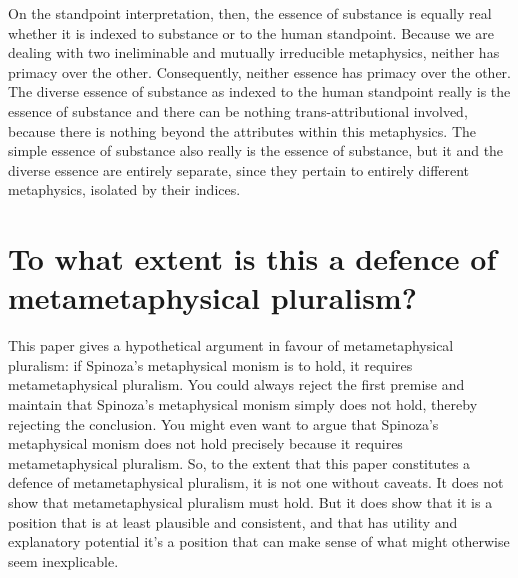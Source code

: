 \documentclass[11pt]{article}
\newcommand{\dash}{\unskip{---}}
\begin{document}
	On the standpoint interpretation, then, the essence of substance is equally real whether it is indexed to substance or to the human standpoint. Because we are dealing with two ineliminable and mutually irreducible metaphysics, neither has primacy over the other. Consequently, neither essence has primacy over the other. The diverse essence of substance as indexed to the human standpoint really is the essence of substance \dash and there can be nothing trans-attributional involved, because there is nothing beyond the attributes within this metaphysics. The simple essence of substance also really is the essence of substance, but it and the diverse essence are entirely separate, since they pertain to entirely different metaphysics, isolated by their indices.
	
	
	
	
	
	
	\section{To what extent is this a defence of metametaphysical pluralism?} \label{sec:Defence}
	
	This paper gives a hypothetical argument in favour of metametaphysical pluralism: if Spinoza's metaphysical monism is to hold, it requires metametaphysical pluralism. You could always reject the first premise and maintain that Spinoza's metaphysical monism simply does not hold, thereby rejecting the conclusion. You might even want to argue that Spinoza's metaphysical monism does not hold precisely because it requires metametaphysical pluralism. So, to the extent that this paper constitutes a defence of metametaphysical pluralism, it is not one without caveats. It does not show that metametaphysical pluralism must hold. But it does show that it is a position  that is at least plausible and consistent, and that has utility and explanatory potential \dash it's a position that can make sense of what might otherwise seem inexplicable.	
	
\end{document}
